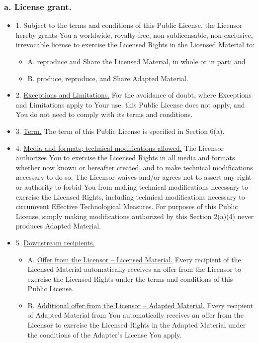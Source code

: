 \subsubsection*{a. License grant.}
	\begin{itemize}
		\item 1. Subject to the terms and conditions of this Public License, the Licensor hereby grants You a worldwide, royalty-free, non-sublicensable, non-exclusive, irrevocable license to exercise the Licensed Rights in the Licensed Material to:
			\begin{itemize}
					\item A. reproduce and Share the Licensed Material, in whole or in part; and
					\item B. produce, reproduce, and Share Adapted Material.
			\end{itemize}
		\item 2. \underline{Exceptions and Limitations.} For the avoidance of doubt, where Exceptions and Limitations apply to Your use, this Public License does not apply, and You do not need to comply with its terms and conditions.
		\item 3. \underline{Term.} The term of this Public License is specified in Section 6(a).
		\item 4. \underline{Media and formats; technical modifications allowed.} The Licensor authorizes You to exercise the Licensed Rights in all media and formats whether now known or hereafter created, and to make technical modifications necessary to do so. The Licensor waives and/or agrees not to assert any right or authority to forbid You from making technical modifications necessary to exercise the Licensed Rights, including technical modifications necessary to circumvent Effective Technological Measures. For purposes of this Public License, simply making modifications authorized by this Section 2(a)(4) never produces Adapted Material.
		\item 5. \underline{Downstream recipients.}
			\begin{itemize}
				\item A. \underline{Offer from the Licensor – Licensed Material.} Every recipient of the Licensed Material automatically receives an offer from the Licensor to exercise the Licensed Rights under the terms and conditions of this Public License.
				\item B. \underline{Additional offer from the Licensor – Adapted Material.} Every recipient of Adapted Material from You automatically receives an offer from the Licensor to exercise the Licensed Rights in the Adapted Material under the conditions of the Adapter’s License You apply.

\end{itemize}
\end{itemize}
